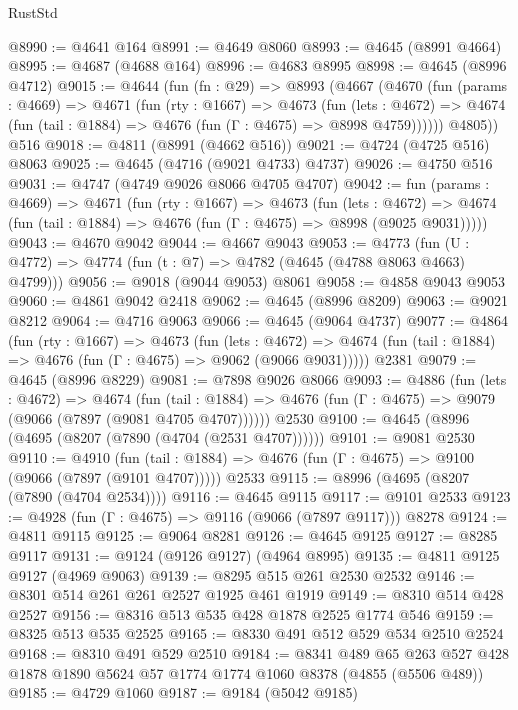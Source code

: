 \begin{lexlean}{RustStd}
\begin{coremodule}
@8990 := @4641 @164
@8991 := @4649 @8060
@8993 := @4645 (@8991 @4664)
@8995 := @4687 (@4688 @164)
@8996 := @4683 @8995
@8998 := @4645 (@8996 @4712)
@9015 := @4644
    (fun (fn : @29) =>
    @8993
      (@4667
        (@4670
          (fun (params : @4669) =>
          @4671
            (fun (rty : @1667) =>
            @4673
              (fun (lets : @4672) =>
              @4674 (fun (tail : @1884) => @4676 (fun (Γ : @4675) => @8998 @4759))))))
        @4805))
    @516
@9018 := @4811 (@8991 (@4662 @516))
@9021 := @4724 (@4725 @516) @8063
@9025 := @4645 (@4716 (@9021 @4733) @4737)
@9026 := @4750 @516
@9031 := @4747 (@4749 @9026 @8066 @4705 @4707)
@9042 := fun (params : @4669) =>
  @4671
    (fun (rty : @1667) =>
    @4673
      (fun (lets : @4672) =>
      @4674 (fun (tail : @1884) => @4676 (fun (Γ : @4675) => @8998 (@9025 @9031)))))
@9043 := @4670 @9042
@9044 := @4667 @9043
@9053 := @4773 (fun (U : @4772) => @4774 (fun (t : @7) => @4782 (@4645 (@4788 @8063 @4663) @4799)))
@9056 := @9018 (@9044 @9053) @8061
@9058 := @4858 @9043 @9053
@9060 := @4861 @9042 @2418
@9062 := @4645 (@8996 @8209)
@9063 := @9021 @8212
@9064 := @4716 @9063
@9066 := @4645 (@9064 @4737)
@9077 := @4864
    (fun (rty : @1667) =>
    @4673
      (fun (lets : @4672) =>
      @4674 (fun (tail : @1884) => @4676 (fun (Γ : @4675) => @9062 (@9066 @9031)))))
    @2381
@9079 := @4645 (@8996 @8229)
@9081 := @7898 @9026 @8066
@9093 := @4886
    (fun (lets : @4672) =>
    @4674
      (fun (tail : @1884) => @4676 (fun (Γ : @4675) => @9079 (@9066 (@7897 (@9081 @4705 @4707))))))
    @2530
@9100 := @4645 (@8996 (@4695 (@8207 (@7890 (@4704 (@2531 @4707))))))
@9101 := @9081 @2530
@9110 := @4910
    (fun (tail : @1884) => @4676 (fun (Γ : @4675) => @9100 (@9066 (@7897 (@9101 @4707)))))
    @2533
@9115 := @8996 (@4695 (@8207 (@7890 (@4704 @2534))))
@9116 := @4645 @9115
@9117 := @9101 @2533
@9123 := @4928 (fun (Γ : @4675) => @9116 (@9066 (@7897 @9117))) @8278
@9124 := @4811 @9115
@9125 := @9064 @8281
@9126 := @4645 @9125
@9127 := @8285 @9117
@9131 := @9124 (@9126 @9127) (@4964 @8995)
@9135 := @4811 @9125 @9127 (@4969 @9063)
@9139 := @8295 @515 @261 @2530 @2532
@9146 := @8301 @514 @261 @261 @2527 @1925 @461 @1919
@9149 := @8310 @514 @428 @2527
@9156 := @8316 @513 @535 @428 @1878 @2525 @1774 @546
@9159 := @8325 @513 @535 @2525
@9165 := @8330 @491 @512 @529 @534 @2510 @2524
@9168 := @8310 @491 @529 @2510
@9184 := @8341
    @489
    @65
    @263
    @527
    @428
    @1878
    @1890
    @5624
    @57
    @1774
    @1774
    @1060
    @8378
    (@4855 (@5506 @489))
@9185 := @4729 @1060
@9187 := @9184 (@5042 @9185)

\end{coremodule}
\end{lexlean}
